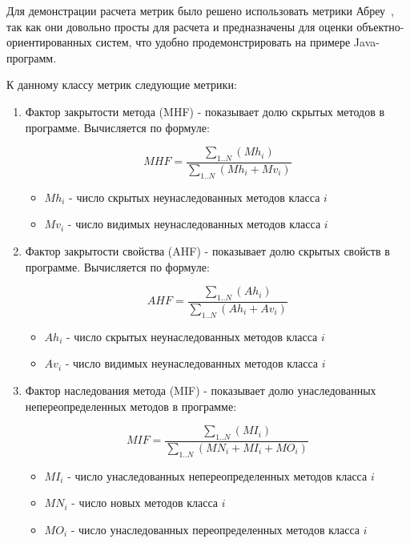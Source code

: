 Для демонстрации расчета метрик было решено использовать метрики
Абреу~\cite{Abreu1998}, так как они довольно просты для расчета и предназначены
для оценки объектно-ориентированных систем, что удобно продемонстрировать на
примере Java-программ.

К данному классу метрик следующие метрики:

\begin{enumerate}
    \item Фактор закрытости метода (MHF) - показывает долю скрытых методов в
    программе. Вычисляется по формуле:

    \begin{equation}
        MHF = \frac{\sum_{1..N}(Mh_i)}{\sum_{1..N}(Mh_i + Mv_i)}
    \end{equation}

    \begin{itemize}
        \item $Mh_i$ - число скрытых неунаследованных методов класса $i$
        \item $Mv_i$ - число видимых неунаследованных методов класса $i$
    \end{itemize}

    \item Фактор закрытости свойства (AHF) - показывает долю скрытых свойств в
    программе. Вычисляется по формуле:

    \begin{equation}
        AHF = \frac{\sum_{1..N}(Ah_i)}{\sum_{1..N}(Ah_i + Av_i)}
    \end{equation}

    \begin{itemize}
        \item $Ah_i$ - число скрытых неунаследованных методов класса $i$
        \item $Av_i$ - число видимых неунаследованных методов класса $i$
    \end{itemize}

    \item Фактор наследования метода (MIF) - показывает долю унаследованных
    непереопределенных методов в программе:

    \begin{equation}
        MIF = \frac{\sum_{1..N}(MI_i)}{\sum_{1..N}(MN_i + MI_i + MO_i)}
    \end{equation}

    \begin{itemize}
        \item $MI_i$ - число унаследованных непереопределенных методов класса $i$
        \item $MN_i$ - число новых методов класса $i$
        \item $MO_i$ - число унаследованных переопределенных методов класса $i$
    \end{itemize}


\end{enumerate}
